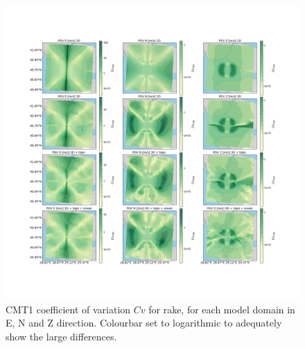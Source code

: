 \documentclass[../Text/00main.tex]{subfiles}
\begin{document}
\begin{figure}[htb]
    \centering
    \includegraphics[width=1\linewidth,trim = 2cm 5cm 1cm 5cm, clip]{images_results/rake_variation_sigma_sc1.png}
    \caption{CMT1 coefficient of variation $Cv$ for rake, for each model domain in E, N and Z direction. Colourbar set to logarithmic to adequately show the large differences.}
    \label{fig:ref_sigma1_rake}
\end{figure}
\end{document}
